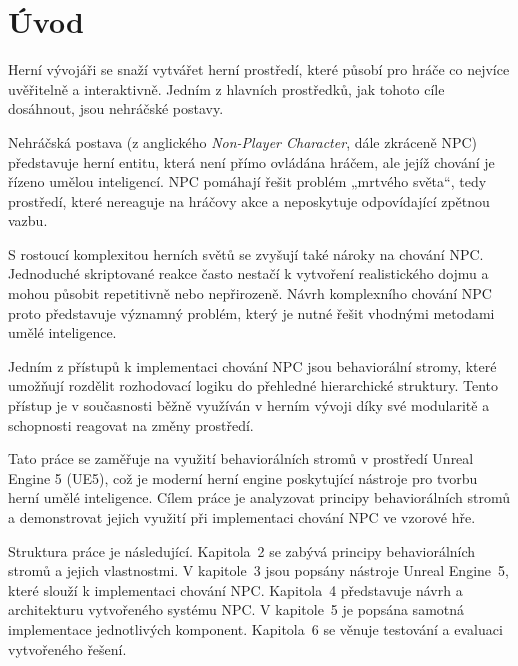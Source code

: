 \chapter{Úvod}

Herní vývojáři se snaží vytvářet herní prostředí, které působí pro hráče co nejvíce uvěřitelně a interaktivně. 
Jedním z hlavních prostředků, jak tohoto cíle dosáhnout, jsou nehráčské postavy.

Nehráčská postava (z anglického \textit{Non-Player Character}, dále zkráceně NPC) představuje herní entitu, 
která není přímo ovládána hráčem, ale jejíž chování je řízeno umělou inteligencí. NPC pomáhají řešit problém 
„mrtvého světa“, tedy prostředí, které nereaguje na hráčovy akce a neposkytuje odpovídající zpětnou vazbu.

S rostoucí komplexitou herních světů se zvyšují také nároky na chování NPC. Jednoduché skriptované reakce často 
nestačí k vytvoření realistického dojmu a mohou působit repetitivně nebo nepřirozeně. Návrh komplexního chování 
NPC proto představuje významný problém, který je nutné řešit vhodnými metodami umělé inteligence.

Jedním z přístupů k implementaci chování NPC jsou behaviorální stromy, které umožňují rozdělit rozhodovací logiku do přehledné hierarchické struktury. 
Tento přístup je v současnosti běžně využíván v herním vývoji díky své  modularitě a schopnosti reagovat na změny prostředí.

Tato práce se zaměřuje na využití behaviorálních stromů v prostředí Unreal Engine 5 (UE5), což je moderní herní 
engine poskytující nástroje pro tvorbu herní umělé inteligence. Cílem práce je analyzovat principy behaviorálních 
stromů a demonstrovat jejich využití při implementaci chování NPC ve vzorové hře.

\medskip

Struktura práce je následující. Kapitola~2 se zabývá principy behaviorálních stromů a jejich vlastnostmi. 
V kapitole~3 jsou popsány nástroje Unreal Engine~5, které slouží k implementaci chování NPC. 
Kapitola~4 představuje návrh a architekturu vytvořeného systému NPC. 
V kapitole~5 je popsána samotná implementace jednotlivých komponent. 
Kapitola~6 se věnuje testování a evaluaci vytvořeného řešení.